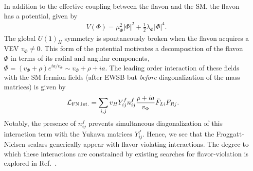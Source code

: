In addition to the effective coupling between the flavon and the SM, the flavon has a potential, given by
\begin{align}
    V(\Phi) = \mu_\Phi^2 |{\Phi}|^2 + \frac{1}{2}\lambda_\Phi|\Phi|^4.\label{eq:FN_potential}
\end{align}
The global $U(1)_H$ symmetry is spontaneously broken when the flavon acquires a VEV $v_\Phi \neq 0$. This form of the potential motivates a decomposition of the flavon $\Phi$ in terms of its radial and angular components, $\Phi = (v_\Phi + \rho) e^{ia/v_\Phi} \sim v_\Phi + \rho + ia$. The leading order interaction of these fields with the SM fermion fields (after EWSB but {\it before} diagonalization of the mass matrices) is given by
\begin{align}
    {\cal L}_{\rm FN,  int.} &= \sum_{i,j}v_H Y_{ij}^f n_{ij}^f\frac{\rho + ia}{v_\Phi}\bar{F}_{Li} F_{Rj}.
\end{align}
Notably, the presence of $n_{ij}^f$ prevents simultaneous diagonalization of this interaction term with the Yukawa matrices $Y_{ij}^f$. Hence, we see that the Froggatt-Nielsen scalars generically appear with flavor-violating interactions. The degree to which these interactions are constrained by existing searches for flavor-violation is explored in Ref.~\cite{Cornella:2024jaw}. 

